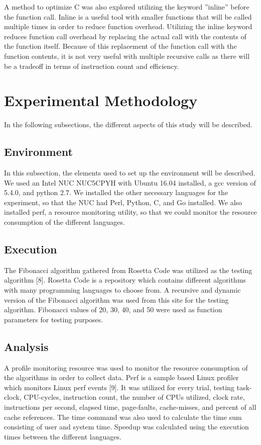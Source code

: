\documentclass{sig-alternate}
\begin{document}
A method to optimize C was also explored utilizing the keyword ''inline'' before the function call. Inline is a useful tool with smaller functions that will be called multiple times in order to reduce function overhead. Utilizing the inline keyword reduces function call overhead by replacing the actual call with the contents of the function itself. Because of this replacement of the function call with the function contents, it is not very useful with multiple recursive calls as there will be a tradeoff in terms of instruction count and efficiency.

\section{Experimental Methodology}

In the following subsections, the different aspects of this study will be described.

\subsection{Environment}

In this subsection, the elements used to set up the environment will be described. We used an Intel NUC NUC5CPYH with Ubuntu 16.04 installed, a gcc version of 5.4.0, and python 2.7. We installed the other necessary languages for the experiment, so that the NUC had Perl, Python, C, and Go installed. We also installed perf, a resource monitoring utility, so that we could monitor the resource consumption of the different languages.    

\subsection{Execution}

The Fibonacci algorithm gathered from Rosetta Code was utilized as the testing algorithm [8]. Rosetta Code is a repository which contains different algorithms with many programming languages to choose from. A recursive and dynamic version of the Fibonacci algorithm was used from this site for the testing algorithm. Fibonacci values of 20, 30, 40, and 50 were used as function parameters for testing purposes.

\subsection{Analysis}

A profile monitoring resource was used to monitor the resource consumption of the algorithms in order to collect data. Perf is a sample based Linux profiler which monitors Linux perf events [9]. It was utilized for every trial, testing task-clock, CPU-cycles, instruction count, the number of CPUs utilized, clock rate, instructions per second, elapsed time, page-faults, cache-misses, and percent of all cache references. The time command was also used to calculate the time sum consisting of user and system time. Speedup was calculated using the execution times between the different languages.
\end{document}
